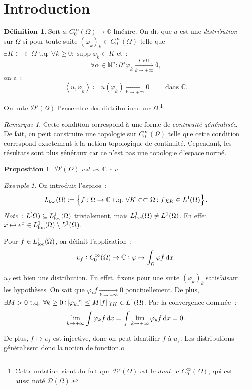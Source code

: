 \documentclass{report}
\DeclareMathOperator{\supp}{supp}
\newcommand{\C}{{\mathbb C}}
\newcommand{\N}{{\mathbb N}}
\newcommand{\scpr}[2]{\left\langle#1, #2\right\rangle}
\newcommand{\tq}{\text{ t.q. }}
\newcommand{\st}{\tq}
\newcommand{\pinfty}{{+\infty}}
\newcommand{\loc}{{\text{\textnormal{loc}}}}
\newtheorem{prp}[thm]{Proposition}
\theoremstyle{definition}
\newtheorem{déf}[thm]{Définition}
\theoremstyle{remark}
\newtheorem*{rmq}{Remarque}
\newtheorem{ex}{Exemple}[chapter]
\begin{document}
\section{Introduction}
\begin{déf} Soit $u : C^\infty_0(\Omega) \to \C$ linéaire. On dit que $u$ est une \textit{distribution} sur $\Omega$ si pour toute suite $(\varphi_k)_k \subset C^\infty_0(\Omega)$
telle que $\exists K \subset\subset \Omega \st \forall k \geq 0 : \supp \varphi_k \subset K$ et~:
\[\forall \alpha \in \N^n : \partial^\alpha\varphi_k \xrightarrow[k \to \pinfty]{\text{CVU}} 0,\]
on a~:
\[\scpr u{\varphi_k} \coloneqq u(\varphi_k) \xrightarrow[k \to \pinfty]{} 0 \qquad\text{ dans } \C.\]

On note $\mathcal D'(\Omega)$ l'ensemble des distributions sur $\Omega$.\footnote{Cette notation vient du fait que $\mathcal D'(\Omega)$ est le \textit{dual} de $C^\infty_0(\Omega)$,
qui est aussi noté $\mathcal D(\Omega)$.}
\end{déf}

\begin{rmq} Cette condition correspond à une forme de \textit{continuité généralisée}. De fait, on peut construire une topologie sur $C^\infty_0(\Omega)$ telle que cette
condition correspond exactement à la notion topologique de continuité. Cependant, les résultats sont plus généraux car ce n'est pas une topologie d'espace normé.
\end{rmq}

\begin{prp} $\mathcal D'(\Omega)$ est un $\C$-e.v.
\end{prp}

\begin{ex}\label{ex:L^1_loc}
On introduit l'espace~:
\[L^1_\loc(\Omega) \coloneqq \left\{f : \Omega \to \C \st \forall K \subset\subset \Omega : f\chi_K \in L^1(\Omega)\right\}.\]
\textit{Note~:} $L^(\Omega) \subseteq L^1_\loc(\Omega)$ trivialement, mais $L^1_\loc(\Omega) \neq L^1(\Omega)$. En effet $x \mapsto e^x \in L^1_\loc(\Omega) \setminus L^1(\Omega)$.

Pour $f \in L^1_\loc(\Omega)$, on définit l'application~:
\[u_f : C^\infty_0(\Omega) \to \C : \varphi \mapsto \int_\Omega\varphi f\dif x.\]

$u_f$ est bien une distribution. En effet, fixons pour une suite $(\varphi_k)_k$ satisfaisant les hypothèses. On sait que $\varphi_kf \xrightarrow[k \to \pinfty]{} 0$
ponctuellement. De plus, $\exists M > 0 \st \forall k \geq 0 : \abs {\varphi_kf} \leq M\abs f\chi_K \in L^1(\Omega)$. Par la convergence dominée~:
\[\lim_{k \to \pinfty}\int\varphi_k f\dif x = \int \lim_{k \to \pinfty}\varphi_k f\dif x = 0.\]

De plus, $f \mapsto u_f$ est injective, donc on peut identifier $f$ à $u_f$. Les distributions généralisent donc la notion de fonction.o
\end{ex}
\end{document}
